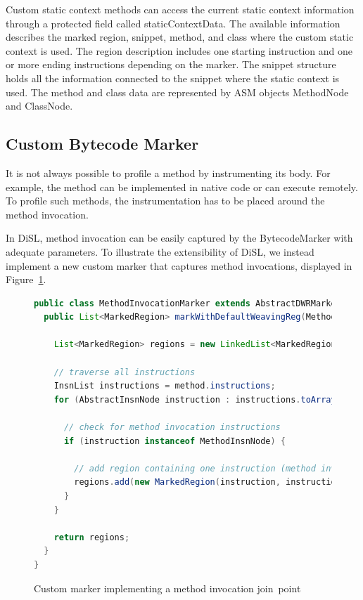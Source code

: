 \documentclass{article}
\newcommand{\brcode}[1]{\textsf{#1}}
\newcommand{\code}[1]{\mbox{\brcode{#1}}}
\begin{document}
Custom static context methods can access the current static context information through a protected field called \code{staticContextData}.
The available information describes the marked region, snippet, method, and class where the custom static context is used.
The region description includes one starting instruction and one or more ending instructions depending on the marker.
The snippet structure holds all the information connected to the snippet where the static context is used.
The method and class data are represented by ASM objects \code{MethodNode} and \code{ClassNode}.


\subsection{Custom Bytecode Marker}

It is not always possible to profile a method by instrumenting its body.
For example, the method can be implemented in native code or can execute remotely.
To profile such methods, the instrumentation has to be placed around the method invocation.

In DiSL, method invocation can be easily captured by the \code{BytecodeMarker} with adequate parameters.
To illustrate the extensibility of DiSL, we instead implement a new custom marker that captures method invocations, displayed in Figure~\ref{fig:instr-prof-cm}.

\begin{figure}[h!]
\smaller
\begin{lstlisting}[language=Java]
public class MethodInvocationMarker extends AbstractDWRMarker {
  public List<MarkedRegion> markWithDefaultWeavingReg(MethodNode method) {

    List<MarkedRegion> regions = new LinkedList<MarkedRegion>();

    // traverse all instructions
    InsnList instructions = method.instructions;
    for (AbstractInsnNode instruction : instructions.toArray()) {

      // check for method invocation instructions
      if (instruction instanceof MethodInsnNode) {

        // add region containing one instruction (method invocation)
        regions.add(new MarkedRegion(instruction, instruction));
      }
    }

    return regions;
  }
}
\end{lstlisting}
\caption{Custom marker implementing a method invocation join~point}
\label{fig:instr-prof-cm}
\end{figure}
\end{document}

